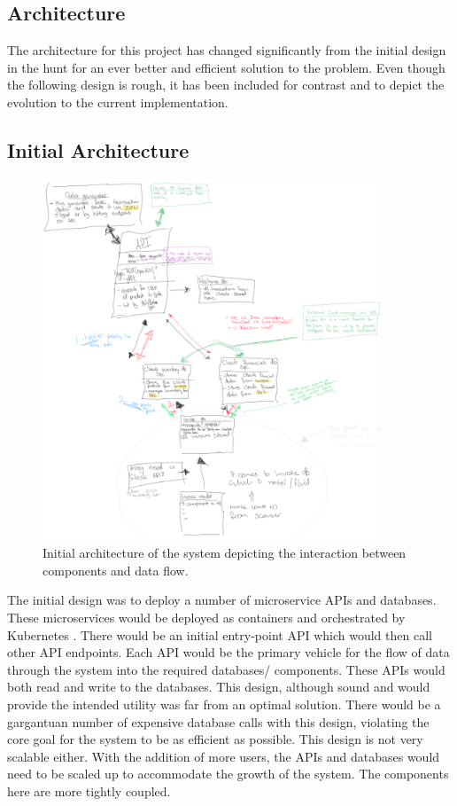 \begin{flushleft}
	\section{Architecture}
	The architecture for this project has changed significantly from the initial design in the hunt for an ever better and efficient solution to the problem. Even though the following design is rough,
	it has been included for contrast and to depict the evolution to the current implementation.
	\subsection{Initial Architecture}
	\begin{figure}[ht]
		\begin{center}
			\includegraphics[width=0.9\textwidth]{figures/initial_architecture.png}
			\caption{Initial architecture of the system depicting the interaction between components and data flow.}
			\label{fig: 1.2}
		\end{center}
	\end{figure}
	\bigbreak
	The initial design was to deploy a number of microservice APIs and databases. These microservices would be deployed as containers and orchestrated by Kubernetes \autocite{Concepts}. There
	would be an initial entry-point API which would then call other API endpoints.
	Each API would be the primary vehicle for the flow of data through the system into the required databases/ components. These APIs would both read and write to the databases.
	\bigbreak
	This design, although sound and would provide the intended utility was far from an optimal solution.
	There would be a gargantuan number of expensive database calls with this design, violating the core goal for the system to 	be as efficient as possible. This design is not very scalable
	either. With the addition of more users, the APIs and databases would need to be scaled up to accommodate the growth of the system. The components here are more tightly coupled.

\end{flushleft}

